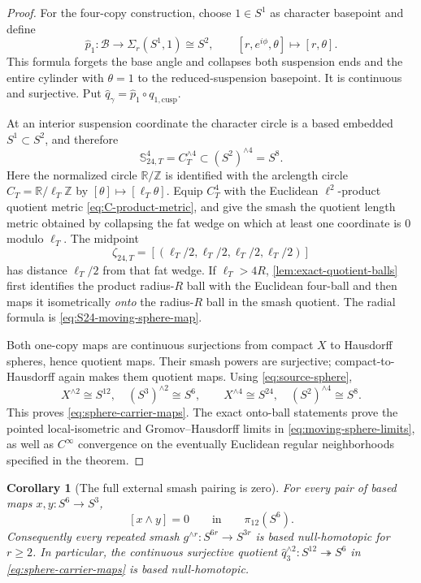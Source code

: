 \documentclass[11pt,letterpaper]{article}
\numberwithin{equation}{section}
\newtheorem{corollary}[theorem]{Corollary}
\theoremstyle{definition}
\theoremstyle{remark}
\newcommand{\R}{\mathbb R}
\newcommand{\Z}{\mathbb Z}
\begin{document}
\begin{proof}
For the four-copy construction, choose \(1\in S^1\) as character
basepoint and define
\[
 \widehat p_1:\mathcal B\longrightarrow\Sigma_r(S^1,1)\cong S^2,
 \qquad
 [r,e^{i\phi},\theta]\longmapsto[r,\theta].
\]
This formula forgets the base angle and collapses both suspension ends
and the entire cylinder with \(\theta=1\) to the reduced-suspension
basepoint.  It is continuous and surjective.  Put
\(\widehat q_\gamma=\widehat p_1\circ q_{1,\mathrm{cusp}}\).

At an interior suspension coordinate the character circle is a based
embedded \(S^1\subset S^2\), and therefore
\[
 \mathbb S_{24,T}^4=C_T^{\wedge4}
 \subset(S^2)^{\wedge4}=S^8.
\]
Here the normalized circle \(\R/\Z\) is identified with the arclength
circle \(C_T=\R/\ell_T\Z\) by
\([\theta]\mapsto[\ell_T\theta]\).  Equip \(C_T^4\) with the Euclidean
\(\ell^2\)-product quotient metric \cref{eq:C-product-metric}, and give
the smash the quotient length metric obtained by collapsing the fat wedge on which at
least one coordinate is \(0\) modulo \(\ell_T\).  The midpoint
\[
 \zeta_{24,T}
 =[(\ell_T/2,\ell_T/2,\ell_T/2,\ell_T/2)]
\]
has distance \(\ell_T/2\) from that fat wedge.  If \(\ell_T>4R\),
\cref{lem:exact-quotient-balls} first identifies the product radius-\(R\)
ball with the Euclidean four-ball and then maps it isometrically
\emph{onto} the radius-\(R\) ball in the smash quotient.  The radial
formula is
\cref{eq:S24-moving-sphere-map}.

Both one-copy maps are continuous surjections from compact \(X\) to
Hausdorff spheres, hence quotient maps.  Their smash powers are
surjective; compact-to-Hausdorff again makes them quotient maps.  Using
\cref{eq:source-sphere},
\[
 X^{\wedge2}\cong S^{12},\quad(S^3)^{\wedge2}\cong S^6,
 \qquad
 X^{\wedge4}\cong S^{24},\quad(S^2)^{\wedge4}\cong S^8.
\]
This proves \cref{eq:sphere-carrier-maps}.  The exact onto-ball statements
prove the pointed local-isometric and Gromov--Hausdorff limits in
\cref{eq:moving-sphere-limits}, as well as \(C^\infty\) convergence on the
eventually Euclidean regular neighborhoods specified in the theorem.
\end{proof}

\begin{corollary}[The full external smash pairing is zero]
\label{cor:full-S12-map-null}
For every pair of based maps \(x,y:S^6\to S^3\),
\[
 [x\wedge y]=0\qquad\text{in}\qquad\pi_{12}(S^6).
\]
Consequently every repeated smash \(g^{\wedge r}:S^{6r}\to S^{3r}\) is
based null-homotopic for \(r\geq2\).  In particular, the continuous
surjective quotient
\(\widehat q_3^{\wedge2}:S^{12}\twoheadrightarrow S^6\) in
\cref{eq:sphere-carrier-maps} is based null-homotopic.
\end{corollary}
\end{document}
